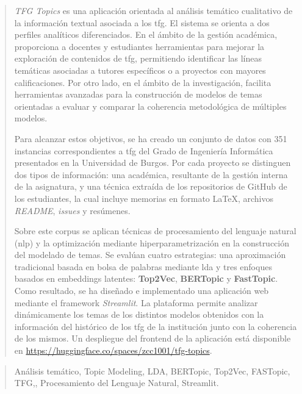 \documentclass[a4paper,12pt,twoside]{memoir}
\newcommand{\nombreProyecto}{\textit{TFG Topics}\xspace}
\begin{document}
\renewcommand*\abstractname{Resumen}
\begin{abstract}
  \nombreProyecto{} es una aplicación orientada al análisis temático cualitativo de la información textual asociada a los \acrfull{tfg}. El sistema se orienta a dos perfiles analíticos diferenciados. En el ámbito de la gestión académica, proporciona a docentes y estudiantes herramientas para mejorar la exploración de contenidos de \Acrshort{tfg}, permitiendo identificar las líneas temáticas asociadas a tutores específicos o a proyectos con mayores calificaciones. Por otro lado, en el ámbito de la investigación, facilita herramientas avanzadas para la construcción de modelos de temas orientadas a evaluar y comparar la coherencia metodológica de múltiples modelos.

  Para alcanzar estos objetivos, se ha creado un conjunto de datos con 351
  instancias correspondientes a \Acrshort{tfg} del Grado de Ingeniería
  Informática presentados en la Universidad de Burgos. Por cada proyecto se
  distinguen dos tipos de información: una académica, resultante de la gestión
  interna de la asignatura, y una técnica extraída de los repositorios de GitHub
  de los estudiantes, la cual incluye memorias en formato LaTeX, archivos
  \textit{README}, \textit{issues} y resúmenes.

  Sobre este corpus se aplican técnicas de procesamiento del lenguaje natural
  (\Acrshort{nlp}) y la optimización mediante hiperparametrización en la
  construcción del modelado de temas. Se evalúan cuatro estrategias: una
  aproximación tradicional basada en bolsa de palabras mediante \acrfull{lda} y
  tres enfoques basados en embeddings latentes: \textbf{Top2Vec},
  \textbf{BERTopic} y \textbf{FastTopic}. Como resultado, se ha diseñado e
  implementado una aplicación web mediante el framework \textit{Streamlit}. La
  plataforma permite analizar dinámicamente los temas de los distintos modelos
  obtenidos con la información del histórico de los \Acrshort{tfg} de la
  institución junto con la coherencia de los mismos. Un despliegue del frontend
  de la aplicación está disponible en
  \url{https://huggingface.co/spaces/zcc1001/tfg-topics}.

\end{abstract}

\renewcommand*\abstractname{Descriptores}
\begin{abstract}
  Análisis temático, Topic Modeling, LDA, BERTopic, Top2Vec, FASTopic, TFG,, Procesamiento del Lenguaje Natural, Streamlit.
\end{abstract}
\end{document}
